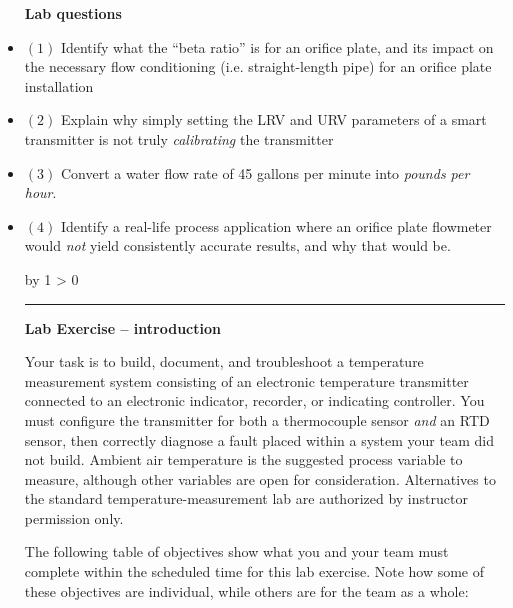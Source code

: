 \documentclass[12pt,a4paper]{article}
\def\oppgave{
            \advance\questnum by 1
            \ifnum \questnum > 0
                 \hrule
                 \vskip 3pt
                 \leftline{Oppgave \the\questnum}
                 \vskip 3pt \fi}
\begin{document}
\begin{itemize}
\vfil \eject

\noindent
{\bf Lab questions}

\vskip 20pt

\item{$(1)$} Identify what the ``beta ratio'' is for an orifice plate, and its impact on the necessary flow conditioning (i.e. straight-length pipe) for an orifice plate installation

\vskip 20pt

\item{$(2)$} Explain why simply setting the LRV and URV parameters of a smart transmitter is not truly {\it calibrating} the transmitter

\vskip 20pt

\item{$(3)$} Convert a water flow rate of 45 gallons per minute into {\it pounds per hour}.

\vskip 20pt

\item{$(4)$} Identify a real-life process application where an orifice plate flowmeter would {\it not} yield consistently accurate results, and why that would be.
 



\vfil \eject 




\oppgave{} 

\noindent
{\bf Lab Exercise -- introduction}

\vskip 5pt

Your task is to build, document, and troubleshoot a temperature measurement system consisting of an electronic temperature transmitter connected to an electronic indicator, recorder, or indicating controller.  You must configure the transmitter for both a thermocouple sensor {\it and} an RTD sensor, then correctly diagnose a fault placed within a system your team did not build.  Ambient air temperature is the suggested process variable to measure, although other variables are open for consideration.  Alternatives to the standard temperature-measurement lab are authorized by instructor permission only.

The following table of objectives show what you and your team must complete within the scheduled time for this lab exercise.  Note how some of these objectives are individual, while others are for the team as a whole:


\end{itemize}
\end{document}
